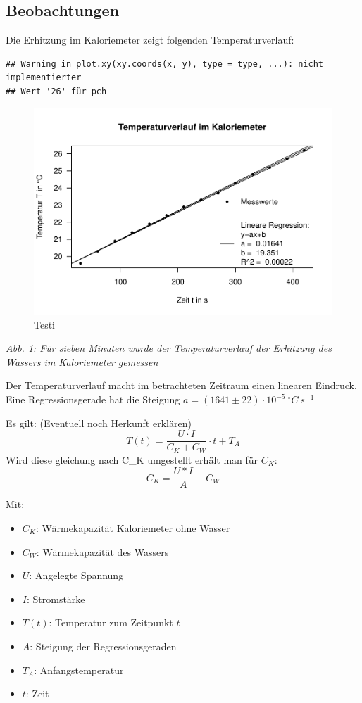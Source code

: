 \documentclass[
  9pt,
]{article}
\begin{document}
\hypertarget{beobachtungen}{%
\subsection{Beobachtungen}\label{beobachtungen}}

Die Erhitzung im Kaloriemeter zeigt folgenden Temperaturverlauf:

\begin{verbatim}
## Warning in plot.xy(xy.coords(x, y), type = type, ...): nicht implementierter
## Wert '26' für pch
\end{verbatim}

\begin{figure}

{\centering \includegraphics{Kaloriemeter_files/figure-latex/unnamed-chunk-1-1} 

}

\caption{Testi}\label{fig:unnamed-chunk-1}
\end{figure}

\emph{Abb. 1: Für sieben Minuten wurde der Temperaturverlauf der
Erhitzung des Wassers im Kaloriemeter gemessen}

Der Temperaturverlauf macht im betrachteten Zeitraum einen linearen
Eindruck. Eine Regressionsgerade hat die Steigung
\(a=(1641\pm 22)\cdot 10^{-5}\ ^{\circ} C\ s^{-1}\)

Es gilt: (Eventuell noch Herkunft erklären)
\[T(t) = \frac{U\cdot I}{C_K + C_W}\cdot t + T_A\] Wird diese gleichung
nach C\_K umgestellt erhält man für \(C_K\): \[C_K = \frac{U*I}{A}-C_W\]

Mit:

\begin{itemize}
  \item $C_K$: Wärmekapazität Kaloriemeter ohne Wasser
  \item $C_W$: Wärmekapazität des Wassers
  \item $U$: Angelegte Spannung
  \item $I$: Stromstärke
  \item $T(t)$: Temperatur zum Zeitpunkt $t$
  \item $A$: Steigung der Regressionsgeraden
  \item $T_A$: Anfangstemperatur
  \item $t$: Zeit
\end{itemize}
\end{document}
